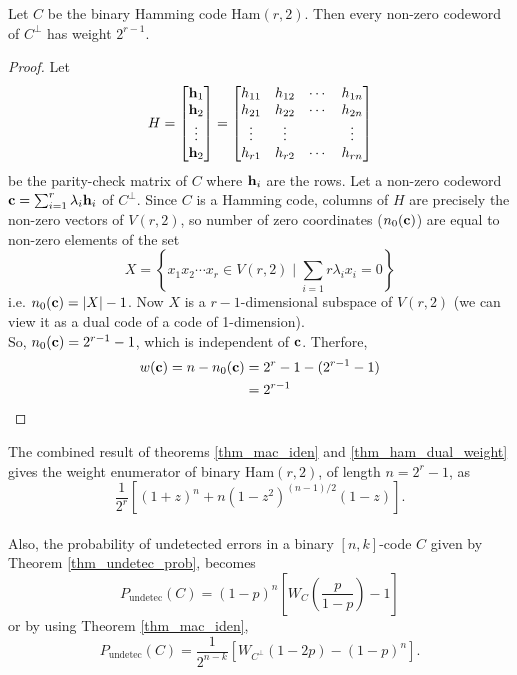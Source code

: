 \documentclass[../main.tex]{subfiles}
\begin{document}
\begin{thm}\label{thm_ham_dual_weight}
	Let $C$ be the binary Hamming code Ham$(r,2)$. Then every non-zero codeword of $C^\perp$ has weight $2^{r-1}$.
\end{thm}

\begin{proof}
	Let
	\[
		H = 
		\begin{bmatrix}
			\textbf{h}_1 \\ 
			\textbf{h}_2\\ 
			\vdots\\ 
			\textbf{h}_2 \\
		\end{bmatrix}
		= 
		\begin{bmatrix}
			h_{11} & h_{12} & \cdots & h_{1n} \\
			h_{21} & h_{22} & \cdots & h_{2n} \\
			\vdots & \vdots & & \vdots \\
			h_{r1} & h_{r2} & \cdots & h_{rn} \\			
		\end{bmatrix}
	\]
	be the parity-check matrix of $C$ where $\textbf{h}_i$ are the rows. Let a non-zero codeword $\textbf{c} = \sum_{i=1}^{r} \lambda_i \textbf{h}_i$ of $C^\perp$. Since $C$ is a Hamming code, columns of $H$ are precisely the non-zero vectors of $V(r,2)$, so number of zero coordinates ($n_0(\textbf{c})$) are equal to non-zero elements of the set
	\[
		X = \left\{ x_1x_2\cdots x_r \in V(r,2)\; \Big | \;\sum_{i=1}{r} \lambda_i x_i = 0 \right \}
	\]
	i.e. $n_0(\textbf{c}) = |X| - 1$.
	Now $X$ is a $r-1$-dimensional subspace of $V(r,2)$ (we can view it as a dual code of a code of 1-dimension).\\
	So, $n_0(\textbf{c}) = 2^{r-1} - 1$, which is independent of $\textbf{c}$.
	Therfore, 
	\begin{align*} 
		w(\textbf{c}) = n - n_0(\textbf{c}) &= 2^r - 1 - (2^{r-1} - 1)\\
		&= 2^{r-1}
	\end{align*}
\end{proof}

The combined result of theorems \ref{thm_mac_iden} and \ref{thm_ham_dual_weight} gives the weight enumerator of binary Ham$(r,2)$, of length $n = 2^r - 1$, as
\[
	\dfrac{1}{2^r}[ (1+z)^n + n(1-z^2)^{(n-1)/2}(1-z)].
\]\\

Also, the probability of undetected errors in a binary $[n,k]$-code $C$ given by Theorem \ref{thm_undetec_prob}, becomes
\[
	P_{\text{undetec}}(C) = (1-p)^n \left[ W_C\left( \dfrac{p}{1-p} \right) - 1 \right]
\]
or by using Theorem \ref{thm_mac_iden},
\[
	P_{\text{undetec}}(C) = \dfrac{1}{2^{n-k}}[ W_{C^\perp}(1-2p) - (1-p)^n].
\]
\end{document}
